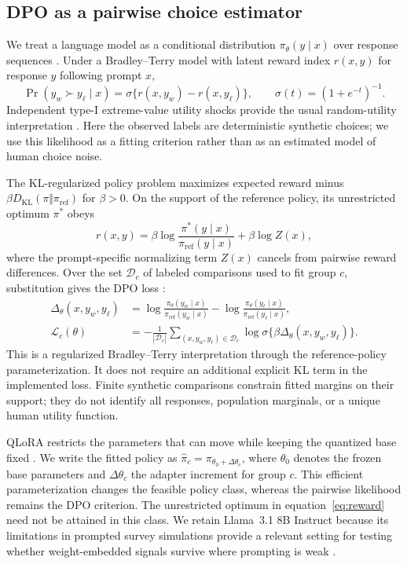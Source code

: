 \subsection{DPO as a pairwise choice estimator}
We treat a language model as a conditional distribution $\pi_\theta(y\mid x)$ over response sequences \cite{ludwig2026}. Under a Bradley--Terry model with latent reward index $r(x,y)$ for response $y$ following prompt $x$,
\begin{equation}
\Pr(y_w\succ y_\ell\mid x)=\sigma\{r(x,y_w)-r(x,y_\ell)\},\qquad \sigma(t)=(1+e^{-t})^{-1}.
\end{equation}
Independent type-I extreme-value utility shocks provide the usual random-utility interpretation \cite{bradleyterry1952}. Here the observed labels are deterministic synthetic choices; we use this likelihood as a fitting criterion rather than as an estimated model of human choice noise.

The KL-regularized policy problem maximizes expected reward minus $\beta D_{\mathrm{KL}}(\pi\Vert\pi_{\mathrm{ref}})$ for $\beta>0$. On the support of the reference policy, its unrestricted optimum $\pi^*$ obeys
\begin{equation}
r(x,y)=\beta\log\frac{\pi^*(y\mid x)}{\pi_{\mathrm{ref}}(y\mid x)}+\beta\log Z(x),
\label{eq:reward}
\end{equation}
where the prompt-specific normalizing term $Z(x)$ cancels from pairwise reward differences. Over the set $\mathcal{D}_c$ of labeled comparisons used to fit group $c$, substitution gives the DPO loss \cite{rafailov2023}:
\begin{align}
\Delta_\theta(x,y_w,y_\ell)&=\log\frac{\pi_\theta(y_w\mid x)}{\pi_{\mathrm{ref}}(y_w\mid x)}-\log\frac{\pi_\theta(y_\ell\mid x)}{\pi_{\mathrm{ref}}(y_\ell\mid x)},\\
\mathcal L_c(\theta)&=-\frac{1}{|\mathcal D_c|}\sum_{(x,y_w,y_\ell)\in\mathcal D_c}\log\sigma\{\beta\Delta_\theta(x,y_w,y_\ell)\}.
\label{eq:dpo}
\end{align}
This is a regularized Bradley--Terry interpretation through the reference-policy parameterization. It does not require an additional explicit KL term in the implemented loss. Finite synthetic comparisons constrain fitted margins on their support; they do not identify all responses, population marginals, or a unique human utility function.

QLoRA restricts the parameters that can move while keeping the quantized base fixed \cite{hu2022,dettmers2023}. We write the fitted policy as $\widehat\pi_c=\pi_{\theta_0+\Delta\theta_c}$, where $\theta_0$ denotes the frozen base parameters and $\Delta\theta_c$ the adapter increment for group $c$. This efficient parameterization changes the feasible policy class, whereas the pairwise likelihood remains the DPO criterion. The unrestricted optimum in equation~\eqref{eq:reward} need not be attained in this class. We retain Llama~3.1 8B Instruct because its limitations in prompted survey simulations provide a relevant setting for testing whether weight-embedded signals survive where prompting is weak \cite{dalloul2026}.

